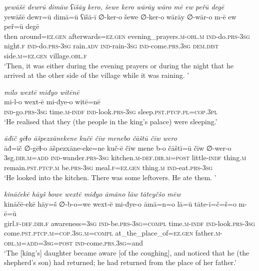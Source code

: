 \ea \label{KŠ.59}
\textit{yewāšē dewrū dimāw ʕīšāy kero, šewe kero wārāy wāro mē ew peřū degē} \\ 
\gll yewāšē dewr=ū dimā=ū ʕīšā-ī ∅-ker-o šewe ∅-ker-o wārāy ∅-wār-o m-ē ew peř=ū degē \\ 
 then around\textsc{\textsc{=ez.gen}} afterwards\textsc{\textsc{=ez.gen}} evening\_prayers\textsc{.m}\textsc{-obl}\textsc{.m} \textsc{ind-}do\textsc{.prs}\textsc{-3sg} night\textsc{.f} \textsc{ind-}do\textsc{.prs}\textsc{-3sg} rain\textsc{.adv} \textsc{ind-}rain\textsc{-3sg} \textsc{ind-}come\textsc{.prs}\textsc{.3sg} \textsc{dem.dist} side\textsc{.m}\textsc{\textsc{=ez.gen}} village\textsc{.obl}\textsc{.f} \\ 
\glt `Then, it was either during the evening prayers or during the night that he arrived at the other side of the village while it was raining. '
\z 
 
\ea \label{KŠ.61}
\textit{milo wextē miđyo witēnē} \\ 
\gll mi-l-o wext-ē mi-đye-o witē=nē \\ 
 \textsc{ind-}go\textsc{.prs}\textsc{-3sg} time\textsc{.m}\textsc{-indf} \textsc{ind-}look\textsc{.prs}\textsc{-3sg} sleep\textsc{.pst}\textsc{.ptcp}\textsc{.pl}\textsc{=cop}\textsc{.3pl} \\ 
\glt `He realised that they (the people in the king’s palace) were sleeping.'
\z 
 
\ea \label{KŠ.63}
\textit{āđīč gēɫo āšpezxānekene kučē čīw menebo čāštū čīw wero} \\ 
\gll āđ=īč ∅-gēɫ-o āšpezxāne-eke=ne kuč-ē čīw mene b-o čāštī=ū čīw ∅-wer-o \\ 
 3sg\textsc{.dir}\textsc{.m}\textsc{=add} \textsc{ind-}wander\textsc{.prs}\textsc{-3sg} kitchen\textsc{.m}\textsc{-def}\textsc{.dir}\textsc{.m}\textsc{=\textsc{post}} little\textsc{-indf} thing\textsc{.m} remain\textsc{.pst}\textsc{.ptcp}\textsc{.m} be\textsc{.prs}\textsc{-3sg} meal\textsc{.f}\textsc{\textsc{=ez.gen}} thing\textsc{.m} \textsc{ind-}eat\textsc{.prs}\textsc{-3sg} \\ 
\glt `He looked into the kitchen. There was some leftovers. He ate them. '
\z 
 
\ea \label{KŠ.65}
\textit{kināčekē hāyš bowe wextē miđyo āmāno lāw tāteyčšo mēw} \\ 
\gll kināčē-ekē hāy=š ∅-b-o=we wext-ē mi-đye-o āmā=n=o lā=ū tāte-ī=č=š=o m-ē=ū \\ 
 girl\textsc{.f}\textsc{-def}\textsc{.dir}\textsc{.f} awareness\textsc{=3sg} \textsc{ind-}be\textsc{.prs}\textsc{-3sg}\textsc{=compl} time\textsc{.m}\textsc{-indf} \textsc{ind-}look\textsc{.prs}\textsc{-3sg} come\textsc{.pst}\textsc{.ptcp}\textsc{.m}\textsc{=cop}\textsc{.3sg}\textsc{.m}\textsc{=compl} at\_the\_place\_of\textsc{\textsc{=ez.gen}} father\textsc{.m}\textsc{-obl}\textsc{.m}\textsc{=add}\textsc{=3sg}\textsc{=\textsc{post}} \textsc{ind-}come\textsc{.prs}\textsc{.3sg}=and \\ 
\glt `The [king’s] daughter became aware [of the coughing], and noticed that he (the shepherd’s son) had returned; he had returned from the place of her father.'
\z 
 
